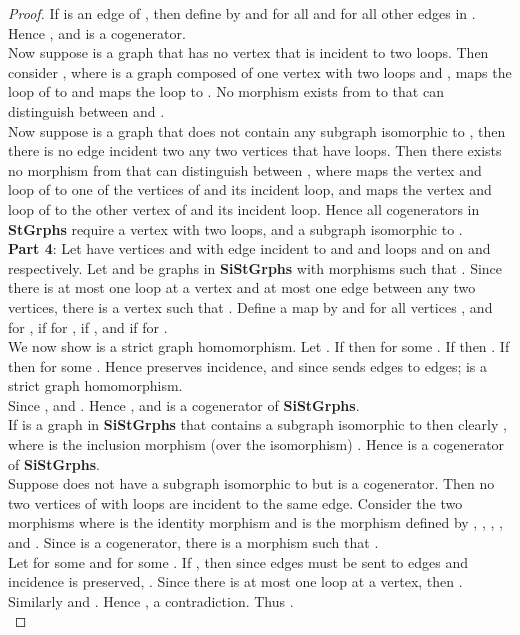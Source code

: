 \documentclass[11pt]{article}
\begin{document}
\begin{proof}
\indent If  is an edge of , then define  by   and  for all  and  for all other edges  in . Hence , and  is a cogenerator.\\
\indent Now suppose  is a graph that has no vertex that is incident to two loops. Then consider , where  is a graph composed of one vertex with two loops  and ,  maps the loop of  to  and  maps the loop to . No morphism exists from  to  that can distinguish between  and .\\
\indent Now suppose  is a graph that does not contain any subgraph isomorphic to , then there is no edge incident two any two vertices that have loops. Then there exists no morphism from  that can distinguish between , where  maps the vertex and loop of  to one of the vertices of  and its incident loop, and  maps the vertex and loop of  to the other vertex of  and its incident loop. Hence all cogenerators in \textbf{StGrphs} require a vertex with two loops, and a subgraph isomorphic to .\\
\indent \textbf{Part 4}: Let  have vertices  and  with edge  incident to  and  and loops  and  on  and  respectively. Let  and  be graphs in 
\textbf{SiStGrphs} with morphisms  such that . Since there is at most one loop at a vertex and at most one edge between any two vertices, there is a vertex  such that . Define a map  by  and  for all vertices , and for ,  if \textunderscore for ,  if \textunderscore, and  if \textunderscore for .\\
\indent We now show  is a strict graph homomorphism. Let . If  then \textunderscore\textunderscore for some . If  then \textunderscore\textunderscore. If  then \textunderscore\textunderscore for some . Hence  preserves incidence, and since  sends edges to edges;  is a strict graph homomorphism.\\
\indent Since ,  and . Hence , and  is a cogenerator of \textbf{SiStGrphs}.\\
\indent If  is a graph in \textbf{SiStGrphs}  that contains a subgraph isomorphic to  then clearly , where  is the inclusion morphism (over the isomorphism) . Hence  is a cogenerator of \textbf{SiStGrphs}.\\
\indent Suppose  does not have a subgraph isomorphic to  but  is a cogenerator. Then no two vertices of  with loops are incident to the same edge. Consider the two morphisms  where  is the identity morphism and  is the morphism defined by , , , , and . Since  is a cogenerator, there is a morphism  such that .\\
\indent Let  for some  and  for some . If , then since edges must be sent to edges and incidence is preserved, \textunderscore\textunderscore\textunderscore. Since there is at most one loop at a vertex, then . Similarly  and . Hence , a contradiction. Thus .\\

\end{proof}
\end{document}
